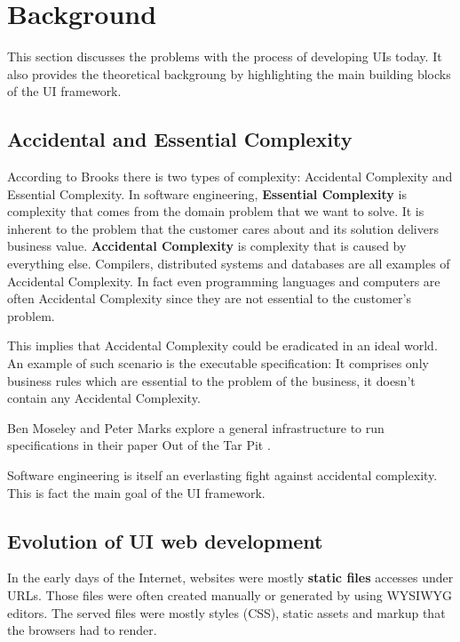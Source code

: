 \section{Background}\label{background}

This section discusses the problems with the process of developing UIs today. It also provides the theoretical backgroung by highlighting the main building blocks of the UI framework.

\subsection{Accidental and Essential Complexity}

According to Brooks there is two types of complexity: Accidental Complexity and Essential Complexity. \citep{nosilverbullet}
In software engineering, \textbf{Essential Complexity} is complexity that comes from the domain problem that we want to solve. It is inherent to the problem that the customer cares about and its solution delivers business value. \textbf{Accidental Complexity} is complexity that is caused by everything else. Compilers, distributed systems and databases are all examples of Accidental Complexity. In fact even programming languages and computers are often Accidental Complexity since they are not essential to the customer's problem.

This implies that Accidental Complexity could be eradicated in an ideal world. An example of such scenario is the executable specification: It comprises only business rules which are essential to the problem of the business, it doesn't contain any Accidental Complexity.

Ben Moseley and Peter Marks explore a general infrastructure to run specifications in their paper Out of the Tar Pit \citep{outoftarpit}.

Software engineering is itself an everlasting fight against accidental complexity. This is fact the main goal of the UI framework.

\subsection{Evolution of UI web development}\label{history}

In the early days of the Internet, websites were mostly \textbf{static files} accesses under URLs. Those files were often created manually or generated by using WYSIWYG editors. The served files were mostly styles (CSS), static assets and markup that the browsers had to render.

